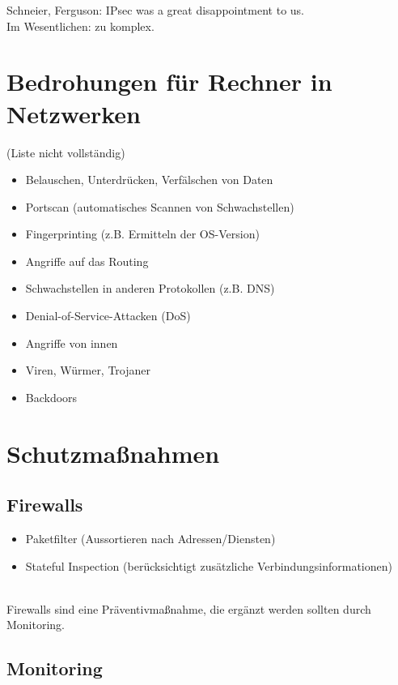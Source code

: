 \documentclass[a4paper,twoside,DIV15,BCOR12mm]{scrbook}
\begin{document}
Schneier, Ferguson: \glqq IPsec was a great disappointment to us.\grqq\\

Im Wesentlichen: zu komplex.

\section{Bedrohungen für Rechner in Netzwerken}

(Liste nicht vollständig)

\begin{itemize}
	\item Belauschen, Unterdrücken, Verfälschen von Daten
	\item Portscan (automatisches Scannen von Schwachstellen)
	\item Fingerprinting (z.B. Ermitteln der OS-Version)
	\item Angriffe auf das Routing
	\item Schwachstellen in anderen Protokollen (z.B. DNS)
	\item Denial-of-Service-Attacken (DoS)
	\item Angriffe von innen
	\item Viren, Würmer, Trojaner
	\item Backdoors
\end{itemize}

\section{Schutzmaßnahmen}

\subsection{Firewalls}

\begin{itemize}
	\item Paketfilter (Aussortieren nach Adressen/Diensten)
	\item Stateful Inspection (berücksichtigt zusätzliche Verbindungsinformationen)
\end{itemize}

\\

Firewalls sind eine Präventivmaßnahme, die ergänzt werden sollten durch Monitoring.

\subsection{Monitoring}
\end{document}
